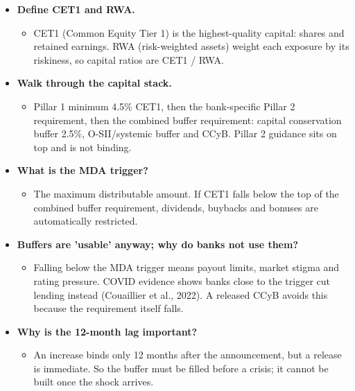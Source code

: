 \documentclass[10pt]{article}
\begin{document}
\begin{tcolorbox}[sbox,width=0.495\linewidth,height=14.6cm,nobeforeafter,box align=top,fit basedim=11pt,colframe=nlred!70,colbacktitle=nlred!8,coltitle=nlred,title=LIKELY CHALLENGES · definitions and logic]
\begin{itemize}
\item[\textcolor{navy}{\textbf{Q}}] \textbf{Define CET1 and RWA.}
\begin{itemize}
\item CET1 (Common Equity Tier 1) is the highest-quality capital: shares and retained earnings. RWA (risk-weighted assets) weight each exposure by its riskiness, so capital ratios are CET1 / RWA.
\end{itemize}
\item[\textcolor{navy}{\textbf{Q}}] \textbf{Walk through the capital stack.}
\begin{itemize}
\item Pillar 1 minimum 4.5\% CET1, then the bank-specific Pillar 2 requirement, then the combined buffer requirement: capital conservation buffer 2.5\%, O-SII/systemic buffer and CCyB. Pillar 2 guidance sits on top and is not binding.
\end{itemize}
\item[\textcolor{navy}{\textbf{Q}}] \textbf{What is the MDA trigger?}
\begin{itemize}
\item The maximum distributable amount. If CET1 falls below the top of the combined buffer requirement, dividends, buybacks and bonuses are automatically restricted.
\end{itemize}
\item[\textcolor{navy}{\textbf{Q}}] \textbf{Buffers are 'usable' anyway; why do banks not use them?}
\begin{itemize}
\item Falling below the MDA trigger means payout limits, market stigma and rating pressure. COVID evidence shows banks close to the trigger cut lending instead (Couaillier et al., 2022). A released CCyB avoids this because the requirement itself falls.
\end{itemize}
\item[\textcolor{navy}{\textbf{Q}}] \textbf{Why is the 12-month lag important?}
\begin{itemize}
\item An increase binds only 12 months after the announcement, but a release is immediate. So the buffer must be filled before a crisis; it cannot be built once the shock arrives.
\end{itemize}
\end{itemize}
\end{tcolorbox}
\newpage
\end{document}
